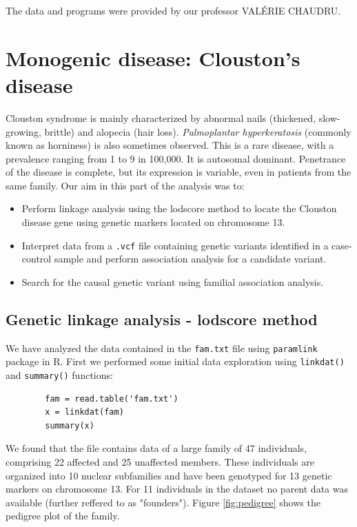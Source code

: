 \documentclass[a4paper,12pt]{article}
\begin{document}
 
The data and programs were provided by our professor VALÉRIE CHAUDRU.

\section{Monogenic disease: Clouston's disease}

Clouston syndrome is mainly characterized by abnormal nails (thickened, slow-growing, brittle) 
and alopecia (hair loss). \textit{Palmoplantar hyperkeratosis} (commonly known as horniness) is 
also sometimes observed. 
This is a rare disease, with a prevalence ranging from 1 to 9 in 100,000. It is autosomal dominant. 
Penetrance of the disease is complete, but its expression is variable, even in patients from the same family.
Our aim in this part of the analysis was to:

\begin{itemize}
    \item Perform linkage analysis using the lodscore method to locate the Clouston disease gene 
    using genetic markers located on chromosome 13.
    \item Interpret data from a \texttt{.vcf} file containing genetic variants identified in a 
    case-control sample and perform association analysis for a candidate variant.
    \item Search for the causal genetic variant using familial association analysis.
\end{itemize}

\subsection{Genetic linkage analysis - lodscore method}

We have analyzed the data contained in the \texttt{fam.txt} file using \texttt{paramlink} package in R. 
First we performed some initial data exploration using \texttt{linkdat()} and \texttt{summary()} functions:

    
    \begin{verbatim}
        fam = read.table('fam.txt')
        x = linkdat(fam)
        summary(x)
        \end{verbatim}


\newpage
We found that the file contains data of a large family of 47 individuals, comprising 22 affected and
 25 unaffected members. These individuals are organized into 10 nuclear subfamilies and 
have been genotyped for 13 genetic markers on chromosome 13. For 11 individuals in the dataset no 
parent data was available (further reffered to as "founders"). Figure \ref{fig:pedigree} shows 
the pedigree plot of the family.
\end{document}
